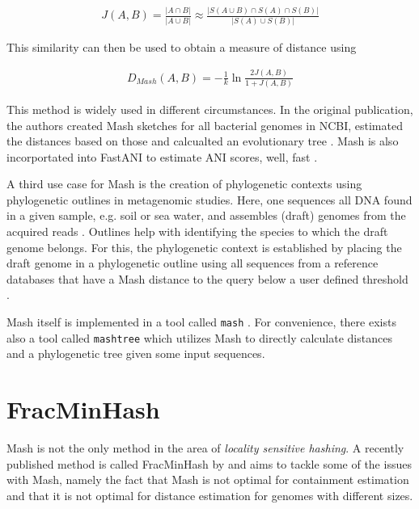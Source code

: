 \begin{align}
  J(A, B) = \frac{|A \cap B|}{|A \cup B|} \approx \frac{|S(A \cup B) \cap S(A) \cap S(B)|}{|S(A) \cup S(B)|}
\end{align}

This similarity can then be used to obtain a measure of distance using

\begin{align}
  D_{Mash}(A,B) = -\frac{1}{k}\ln{\frac{2J(A,B)}{1+J(A,B)}}
\end{align}

This method is widely used in different circumstances. In the
original publication, the authors created Mash sketches for all bacterial
 genomes in NCBI, estimated the
distances based on those and calcualted an evolutionary tree
\cite{ondovMashFastGenome2016}. Mash is also incorportated into FastANI to
estimate ANI scores, well, fast \cite{jainHighThroughputANI2018}.

A third use case for Mash is the creation of phylogenetic contexts using
phylogenetic outlines \cite{bagciMicrobialPhylogeneticContext2021} in
metagenomic studies. Here, one sequences all DNA found in a given sample, e.g.
soil or sea water, and assembles (draft) genomes from the acquired reads
\cite{kuninBioinformaticianGuideMetagenomics2008}. Outlines help with
identifying the species to which the draft genome belongs. For this, the
phylogenetic context is established by placing the draft genome in a
phylogenetic outline using all sequences from a reference databases that have a
Mash distance to the query below a user defined threshold
\cite{bagciMicrobialPhylogeneticContext2021}.

Mash itself is implemented in a tool called \texttt{mash}
\cite{ondovMashFastGenome2016}. For convenience, there exists also a tool called
\texttt{mashtree} \cite{katzMashtreeRapidComparison2019} which utilizes Mash to
directly calculate distances and a phylogenetic tree given some input sequences.

\section{FracMinHash}
Mash is not the only method in the area of \textit{locality sensitive hashing}.
A recently published method is called FracMinHash by
\cite{irberLightweightCompositionalAnalysis2022} and aims to tackle some of the
issues with Mash, namely the fact that Mash is not optimal for containment
estimation and that it is not optimal for distance estimation for genomes with
different sizes.

